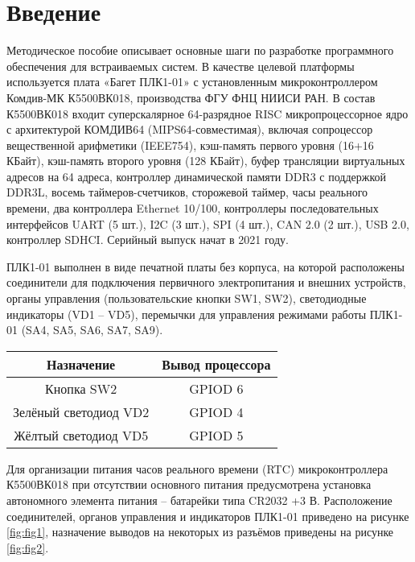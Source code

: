 \chapter*{Введение}

Методическое пособие описывает основные шаги по разработке программного обеспечения для встраиваемых систем. В качестве целевой платформы используется плата «Багет ПЛК1-01» с установленным микроконтроллером Комдив-МК К5500ВК018, производства ФГУ ФНЦ НИИСИ РАН. В состав К5500ВК018 входит суперскалярное 64-разрядное RISC микропроцессорное ядро с архитектурой КОМДИВ64 (MIPS64-совместимая), включая сопроцессор вещественной арифметики (IEEE754), кэш-память первого уровня (16+16 КБайт), кэш-память второго уровня (128 КБайт), буфер трансляции виртуальных адресов на 64 адреса, контроллер динамической памяти DDR3 с поддержкой DDR3L, восемь таймеров-счетчиков, сторожевой таймер, часы реального времени, два контроллера Ethernet 10/100, контроллеры последовательных интерфейсов UART (5 шт.), I2C (3 шт.), SPI (4 шт.), CAN 2.0 (2 шт.), USB 2.0, контроллер SDHCI. Серийный выпуск начат в 2021 году. 

ПЛК1-01 выполнен в виде печатной платы без корпуса, на которой расположены
соединители для подключения первичного электропитания и внешних устройств, органы
управления (пользовательские кнопки SW1, SW2), светодиодные индикаторы (VD1 –
VD5), перемычки для управления режимами работы ПЛК1-01 (SA4, SA5, SA6, SA7, SA9). 

\begin{center}
	\begin{tabular}{||c | c||}
		\hline
		Назначение & Вывод процессора \\ [0.5ex]
		\hline\hline
		Кнопка SW2 & GPIOD 6 \\
		\hline
		Зелёный светодиод VD2 & GPIOD 4 \\
		\hline
		Жёлтый светодиод VD5 & GPIOD 5 \\
		\hline
	\end{tabular}
\end{center}

Для организации питания часов реального времени (RTC) микроконтроллера
К5500ВК018 при отсутствии основного питания предусмотрена установка
автономного элемента питания – батарейки типа CR2032 +3 В.
Расположение соединителей, органов управления и индикаторов ПЛК1-01
приведено на рисунке \ref{fig:fig1}, назначение выводов на некоторых из разъёмов приведены на рисунке \ref{fig:fig2}.


